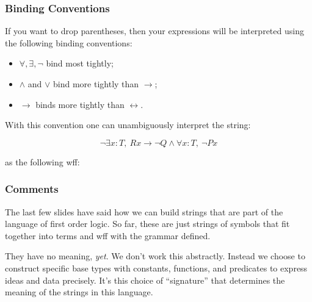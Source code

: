 \documentclass{beamer}
\theoremstyle{indentDefn} \newtheorem{defn}[]{Definition}
\begin{document}
\begin{frame}
	\frametitle{Binding Conventions}
	
	If you want to drop parentheses, then your expressions will be interpreted using the following binding conventions: 
	
	\begin{itemize}
		\item $\forall, \exists, \lnot$ bind most tightly; 
		\item $\land$ and $\lor$ bind more tightly than $\rightarrow$; 
		\item $\rightarrow$ binds more tightly than $\leftrightarrow$. 
	\end{itemize}

	\vspace{0.5cm}

	With this convention one can unambiguously interpret the string:
	
	$$ \lnot \exists x : T, \ Rx \rightarrow \lnot Q \land \forall x : T, \ \lnot Px$$
	
	as the following wff:	
	
	\vfill
	
\end{frame}

\begin{frame}
	\frametitle{Comments}
	
	The last few slides have said how we can build strings that are part of the language of first order logic. So far, these are just strings of symbols that fit together into terms and wff with the grammar defined. 
	
	\vspace{5mm}
	They have no meaning, \emph{yet}. We don't work this abstractly. Instead we choose to construct specific base types with constants, functions, and predicates to express ideas and data precisely. It's this choice of ``signature'' that determines the meaning of the strings in this language. 
	
\end{frame}
\end{document}
